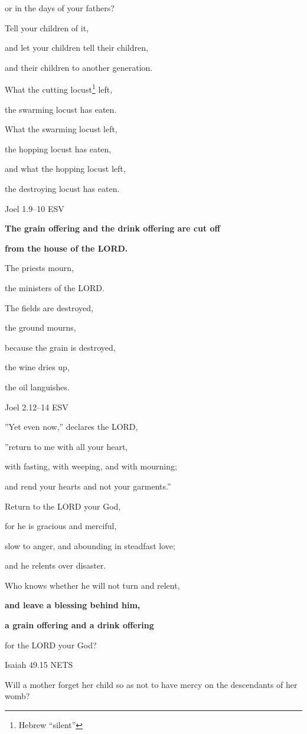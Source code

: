 \documentclass[
]{article}
\newcommand{\RL}[1]{\beginR #1\endR}
\begin{document}
or in the days of your fathers?

Tell your children of it,

and let your children tell their children,

and their children to another generation.

What the cutting locust\footnote{Hebrew ``silent''} left,

the swarming locust has eaten.

What the swarming locust left,

the hopping locust has eaten,

and what the hopping locust left,

the destroying locust has eaten.

Joel 1.9--10 ESV

\textbf{The grain offering and the drink offering are cut off}

\textbf{from the house of the LORD.}

The priests mourn,

the ministers of the LORD.

The fields are destroyed,

the ground mourns,

because the grain is destroyed,

the wine dries up,

the oil languishes.

Joel 2.12--14 ESV

\RL{''}Yet even now,'' declares the LORD,

\RL{''}return to me with all your heart,

with fasting, with weeping, and with mourning;

and rend your hearts and not your garments.''

Return to the LORD your God,

for he is gracious and merciful,

slow to anger, and abounding in steadfast love;

and he relents over disaster.

Who knows whether he will not turn and relent,

\textbf{and leave a blessing behind him,}

\textbf{a grain offering and a drink offering}

for the LORD your God?

Isaiah 49.15 NETS

Will a mother forget her child so as not to have mercy on the
descendants of her womb?
\end{document}
